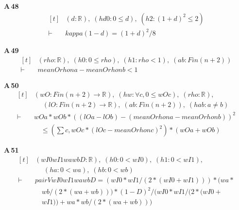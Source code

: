 \noindent\textbf{A\,48}\quad{}
{\footnotesize\[ \begin{aligned}[t]
&(\mathit{d} : \mathbb{R} ),\; (\mathit{hd0} : 0 \leq \mathit{d}),\; (\mathit{h2} : (1+\mathit{d})^{2} \leq 2)\\
\vdash\;&\mathit{kappa} (1-\mathit{d}) = (1+\mathit{d})^{2}/8
\end{aligned} \]}

\noindent\textbf{A\,49}\quad{}
{\footnotesize\[ \begin{aligned}[t]
&(\mathit{rho} : \mathbb{R} ),\; (\mathit{h0} : 0 \leq \mathit{rho}),\; (\mathit{h1} : \mathit{rho} < 1),\; (\mathit{a} \mathit{b} : \mathit{Fin} (\mathit{n}+2))\\
\vdash\;&\mathit{meanO} \mathit{rho} \mathit{n} \mathit{a} - \mathit{meanO} \mathit{rho} \mathit{n} \mathit{b} < 1
\end{aligned} \]}

\noindent\textbf{A\,50}\quad{}
{\footnotesize\[ \begin{aligned}[t]
&(\mathit{wO} : \mathit{Fin} (\mathit{n}+2) \to \mathbb{R} ),\; (\mathit{hw} : \forall \mathit{c}, 0 \leq \mathit{wO} \mathit{c}),\; (\mathit{rho} : \mathbb{R} ),\\
&\quad \; (\mathit{lO} : \mathit{Fin} (\mathit{n}+2) \to \mathbb{R} ),\; (\mathit{a} \mathit{b} : \mathit{Fin} (\mathit{n}+2)),\; (\mathit{hab} : \mathit{a} \neq \mathit{b})\\
\vdash\;&\mathit{wO} \mathit{a}*\mathit{wO} \mathit{b}*((\mathit{lO} \mathit{a} - \mathit{lO} \mathit{b}) - (\mathit{meanO} \mathit{rho} \mathit{n} \mathit{a} - \mathit{meanO} \mathit{rho} \mathit{n} \mathit{b}))^{2}\\
&\quad \leq (\textstyle\sum \mathit{c}, \mathit{wO} \mathit{c}*(\mathit{lO} \mathit{c} - \mathit{meanO} \mathit{rho} \mathit{n} \mathit{c})^{2})*(\mathit{wO} \mathit{a} + \mathit{wO} \mathit{b})
\end{aligned} \]}

\noindent\textbf{A\,51}\quad{}
{\footnotesize\[ \begin{aligned}[t]
&(\mathit{wI0} \mathit{wI1} \mathit{wa} \mathit{wb} \mathit{D} : \mathbb{R} ),\; (\mathit{h0} : 0 < \mathit{wI0}),\; (\mathit{h1} : 0 < \mathit{wI1}),\\
&\quad \; (\mathit{ha} : 0 < \mathit{wa}),\; (\mathit{hb} : 0 < \mathit{wb})\\
\vdash\;&\mathit{pairV} \mathit{wI0} \mathit{wI1} \mathit{wa} \mathit{wb} \mathit{D} = (\mathit{wI0}*\mathit{wI1}/(2*(\mathit{wI0}+\mathit{wI1})))*(\mathit{wa}*\\
&\quad \mathit{wb}/(2*(\mathit{wa}+\mathit{wb})))*(1-\mathit{D})^{2} / (\mathit{wI0}*\mathit{wI1}/(2*(\mathit{wI0}+\\
&\quad \mathit{wI1})) + \mathit{wa}*\mathit{wb}/(2*(\mathit{wa}+\mathit{wb})))
\end{aligned} \]}

